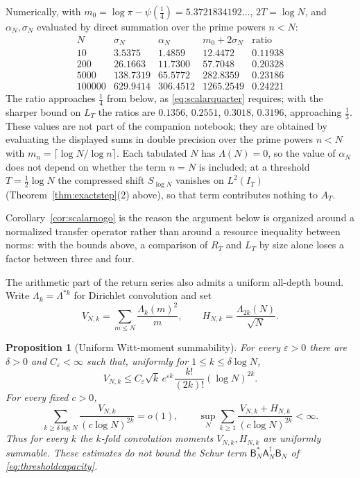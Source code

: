 \documentclass[11pt]{amsart}
\newtheorem{proposition}[theorem]{Proposition}
\theoremstyle{definition}
\theoremstyle{remark}
\begin{document}
Numerically, with \(m_0=\log\pi-\psi(\tfrac14)=5.3721834192\ldots\),
\(2T=\log N\), and \(\alpha_N,\sigma_N\) evaluated by direct summation over
the prime powers \(n<N\):
\[
\begin{array}{c|c|c|c|c}
N&\sigma_N&\alpha_N&m_0+2\sigma_N&\text{ratio}\\ \hline
10     &3.5375  &1.4859  &12.4472   &0.11938\\
200    &26.1663 &11.7300 &57.7048   &0.20328\\
5000   &138.7319&65.5772 &282.8359  &0.23186\\
100000 &629.9414&306.4512&1265.2549 &0.24221
\end{array}
\]
The ratio approaches \(\tfrac14\) from below, as \eqref{eq:scalarquarter}
requires; with the sharper bound on \(L_T\) the ratios are \(0.1356\),
\(0.2551\), \(0.3018\), \(0.3196\), approaching \(\tfrac13\).  These values
are not part of the companion notebook; they are obtained by evaluating the
displayed sums in double precision over the prime powers \(n<N\) with
\(m_n=\lceil\log N/\log n\rceil\).  Each tabulated \(N\) has
\(\Lambda(N)=0\), so the value of \(\alpha_N\) does not depend on whether the
term \(n=N\) is included; at a threshold \(T=\frac12\log N\) the compressed
shift \(S_{\log N}\) vanishes on \(L^2(I_T)\)
(Theorem~\ref{thm:exactstep}(2) above), so that term contributes nothing to
\(A_T\).

Corollary~\ref{cor:scalarnogo} is the reason the argument below is organized
around a normalized transfer operator rather than around a resource
inequality between norms: with the bounds above, a comparison of \(R_T\)
and \(L_T\) by size alone loses a factor between three and four.

The arithmetic part of the return series also admits a uniform all-depth
bound.  Write \(\Lambda_k=\Lambda^{*k}\) for Dirichlet convolution and set
\[
 V_{N,k}=\sum_{m\le N}\frac{\Lambda_k(m)^2}{m},\qquad
 H_{N,k}=\frac{\Lambda_{2k}(N)}{\sqrt N}.
\]

\begin{proposition}[Uniform Witt-moment summability]
\label{prop:uniformWittmoments}
For every \(\varepsilon>0\) there are \(\delta>0\) and
\(C_\varepsilon<\infty\) such that, uniformly for
\(1\le k\le\delta\log N\),
\begin{equation}\label{eq:uniformWittsmall}
 V_{N,k}\le C_\varepsilon\sqrt{k}\,e^{\varepsilon k}
 \frac{k!}{(2k)!}(\log N)^{2k}.
\end{equation}
For every fixed \(c>0\),
\begin{equation}\label{eq:uniformWittlarge}
 \sum_{k\ge\delta\log N}\frac{V_{N,k}}{(c\log N)^{2k}}=o(1),
 \qquad
 \sup_N\sum_{k\ge1}\frac{V_{N,k}+H_{N,k}}{(c\log N)^{2k}}<\infty.
\end{equation}
Thus for every \(k\) the \(k\)-fold convolution moments \(V_{N,k},H_{N,k}\)
are uniformly summable.  These estimates do not bound the Schur term
\(\mathsf B_N^*\mathsf A_N^\dagger\mathsf B_N\) of
\eqref{eq:thresholdcapacity}.
\end{proposition}
\end{document}
